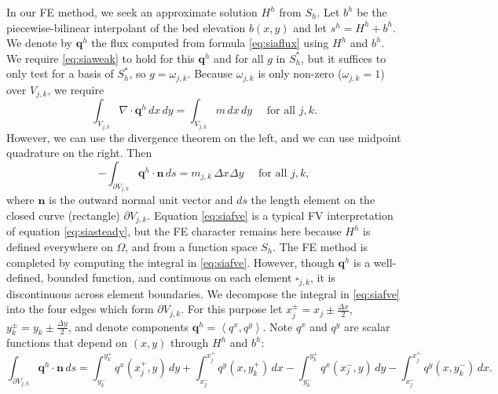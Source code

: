 \documentclass[11pt]{amsart}
\newcommand\bn{\mathbf{n}}
\newcommand\bq{\mathbf{q}}
\newcommand{\Div}{\nabla\cdot}
\newcommand{\ip}[2]{\ensuremath{\left<#1,#2\right>}}
\newcommand{\dxtwo}{\tfrac{\Delta x}{2}}
\newcommand{\dytwo}{\tfrac{\Delta y}{2}}
\begin{document}
In our FE method, we seek an approximate solution $H^h$ from $S_h$.  Let $b^h$ be the piecewise-bilinear interpolant of the bed elevation $b(x,y)$ and let $s^h=H^h+b^h$.  We denote by $\bq^h$ the flux computed from formula \eqref{eq:siaflux} using $H^h$ and $b^h$.  We require \eqref{eq:siaweak} to hold for this $\bq^h$ and for all $g$ in $S_h^*$, but it suffices to only test for a basis of $S_h^*$, so $g=\omega_{j,k}$.  Because $\omega_{j,k}$ is only non-zero ($\omega_{j,k}=1$) over $V_{j,k}$, we require
\begin{equation}
  \int_{V_{j,k}} \Div \bq^h \,dx\,dy = \int_{V_{j,k}} m \,dx\,dy \quad \text{ for all } j,k.  \label{eq:siafve-transition}
\end{equation}
However, we can use the divergence theorem on the left, and we can use midpoint quadrature \cite{Elmanetal2005} on the right.  Then
\begin{equation}
  - \int_{\partial V_{j,k}} \bq^h \cdot \bn\,ds = m_{j,k}\, \Delta x \Delta y \quad \text{ for all } j,k, \label{eq:siafve}
\end{equation}
where $\bn$ is the outward normal unit vector and $ds$ the length element on the closed curve (rectangle) $\partial V_{j,k}$.  Equation \eqref{eq:siafve} is a typical FV interpretation of equation \eqref{eq:siasteady}, but the FE character remains here because $H^h$ is defined everywhere on $\Omega$, and from a function space $S_h$.  The FE method is completed by computing the integral in \eqref{eq:siafve}.  However, though $\bq^h$ is a well-defined, bounded function, and continuous on each element $\square_{j,k}$, it is discontinuous across element boundaries.  We decompose the integral in \eqref{eq:siafve} into the four edges which form $\partial V_{j,k}$.  For this purpose let $x_j^\pm = x_j \pm \dxtwo$, $y_k^\pm = y_k \pm \dytwo$, and denote components $\bq^h = \ip{q^x}{q^y}$.  Note $q^x$ and $q^y$ are scalar functions that depend on $(x,y)$ through $H^h$ and $b^h$:
\begin{equation}
  \int_{\partial V_{j,k}} \bq^h \cdot \bn\,ds = \int_{y_k^-}^{y_k^+} q^x(x_j^+,y)\,dy + \int_{x_j^-}^{x_j^+} q^y(x,y_k^+)\,dx - \int_{y_k^-}^{y_k^+} q^x(x_j^-,y)\,dy - \int_{x_j^-}^{x_j^+} q^y(x,y_k^-)\,dx. \label{eq:fluxintdecomp}
\end{equation}
\end{document}
